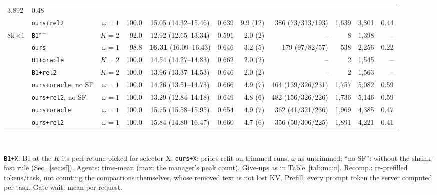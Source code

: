 \documentclass[conference]{IEEEtran}
\newcommand{\K}{$K$}
\newcommand{\x}{$\times$}
\newcommand{\pickf}{$^{\star-}$}
\newcommand{\cfg}[1]{\texttt{#1}}
\begin{document}
\begin{table}[!t]
\begin{tabular}{@{}llrrcrrrrrr@{}}
      3,892 & 0.48 \\
     & \cfg{ours+rel2} & $\omega{=}1$ & 100.0 & 15.05 (14.32--15.46) & 0.639 & 9.9 (12) & 386 (73/313/193) & 1,639 &
      3,801 & 0.44 \\
    \midrule
    8k\,\x1 & \cfg{B1}\pickf & $K{=}2$ & 92.0 & 12.92 (12.65--13.34) & 0.591 & 2.0 (2) & -- & 8 & 1,398 & -- \\
     & \cfg{ours} & $\omega{=}1$ & 98.8 & \textbf{16.31} (16.09--16.43) & 0.646 & 3.2 (5) & 179 (97/82/57) & 538 & 2,256 &
      0.22 \\
     & \cfg{B1+oracle} & $K{=}2$ & 100.0 & 14.54 (14.27--14.83) & 0.662 & 2.0 (2) & -- & 2 & 1,545 & -- \\
     & \cfg{B1+rel2} & $K{=}2$ & 100.0 & 13.96 (13.37--14.53) & 0.646 & 2.0 (2) & -- & 2 & 1,563 & -- \\
     & \cfg{ours+oracle}, no SF & $\omega{=}1$ & 100.0 & 14.26 (13.51--14.73) & 0.666 & 4.9 (7) & 464 (139/326/231) &
      1,757 & 5,082 & 0.59 \\
     & \cfg{ours+rel2}, no SF & $\omega{=}1$ & 100.0 & 13.29 (12.84--14.18) & 0.649 & 4.8 (6) & 482 (156/326/226) &
      1,736 & 5,146 & 0.59 \\
     & \cfg{ours+oracle} & $\omega{=}1$ & 100.0 & 15.75 (15.58--15.95) & 0.654 & 4.9 (7) & 362 (41/321/236) & 1,969 &
      4,385 & 0.47 \\
     & \cfg{ours+rel2} & $\omega{=}1$ & 100.0 & 15.84 (14.80--16.47) & 0.660 & 4.7 (6) & 356 (50/306/225) & 1,891 &
      4,221 & 0.41 \\
    \bottomrule
  \end{tabular}\\[2pt]
  \parbox{\textwidth}{\raggedright\scriptsize \cfg{B1+X}: B1 at the \K{} its perf retune picked for
  selector X. \cfg{ours+X}: priors refit on trimmed runs, $\omega$ as untrimmed; ``no SF'': without the
  shrink-fast rule (Sec.~\ref{sec:sf}). Agents: time-mean (max: the manager's peak count). Give-ups as in
  Table~\ref{tab:main}. Recomp.: re-prefilled tokens/task, not counting the compactions themselves,
  whose removed text is not lost KV. Prefill: every prompt token the server computed per task. Gate
  wait: mean per request.}
\end{table}
\end{document}
